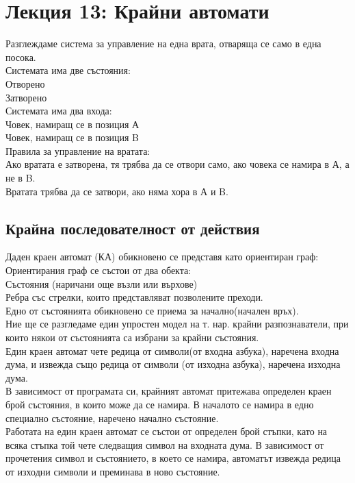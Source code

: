 \documentclass[fleqn, 12pt]{article}
\theoremstyle{definition}
\begin{document}
\section{Лекция 13: Крайни автомати}
Разглеждаме система за управление на една врата, отваряща се само в една посока.\\
Системата има две състояния:\\
Отворено \\
Затворено\\
Системата има два входа:\\
Човек, намиращ се в позиция А\\
Човек, намиращ се в позиция B\\
Правила за управление на вратата:\\
Ако вратата е затворена, тя трябва да се отвори само, ако човека се намира в А, а не в B.\\
Вратата трябва да се затвори, ако няма хора в А и B. 

\subsection{Крайна последователност от действия}
Даден краен автомат (КА) обикновено се представя като ориентиран граф:\\
Ориентирания граф се състои от два обекта:\\
Състояния (наричани още възли или върхове)\\
Ребра със стрелки, които представляват позволените преходи.\\
Едно от състоянията обикновено се приема за начално(начален връх).\\
Ние ще се разгледаме един упростен модел на т. нар.  крайни разпознаватели, при които някои от състоянията са избрани за крайни състояния.\\
Един краен автомат чете редица от символи(от входна азбука), наречена входна дума, и извежда също редица от символи (от изходна азбука), наречена изходна дума.\\
В зависимост от програмата си, крайният автомат притежава определен краен брой състояния, в които може да се намира. В началото се намира в едно специално състояние, наречено начално състояние.\\
Работата на един краен автомат се състои от определен брой стъпки, като на всяка стъпка той чете следващия символ на входната дума. В зависимост от прочетения символ и състоянието, в което се намира, автоматът извежда редица от изходни символи и преминава в ново състояние.\\
\end{document}
